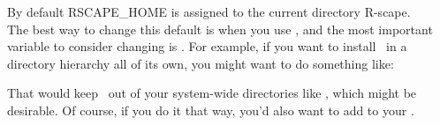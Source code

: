 By default RSCAPE\_HOME is assigned to the current directory
R-scape.\\

The best way to change this default is when you use
, and the most important variable to consider
changing is . For example, if you want to install
\rscape\ in a directory hierarchy all of its own, you might want to do
something like:


That would keep \rscape\ out of your system-wide directories like
, which might be desirable. Of course, if you do
it that way, you'd also want to add  to
your .

